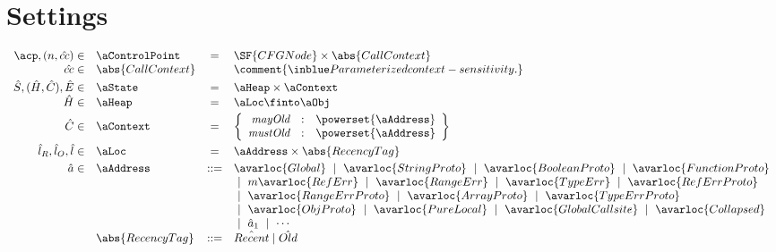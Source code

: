 \section{Settings}
\[
\begin{array}{rlcl}
\acp, (n, \hat{cc}) \in & \aControlPoint & = & \SF{CFGNode} \times \abs{CallContext} \\
\hat{cc} \in & \abs{CallContext} &  & \comment{\inblue  Parameterized context-sensitivity.} \vspace{1mm}\\

\hat{S}, (\hat{H}, \hat{C}), \hat{E} \in & \aState & = &  \aHeap \times \aContext\\
\hat{H} \in & \aHeap & = & \aLoc \finto \aObj \vspace{1mm}\\
\hat{C} \in & \aContext & = &
\left\{ \begin{array}{rcl}
\emph{mayOld} & : & \powerset{\aAddress} \\
\emph{mustOld} & : & \powerset{\aAddress} \\
\end{array} \right\} \vspace{1mm}\\

\hat{l}_R,\hat{l}_O,\hat{l} \in & \aLoc &  = & \aAddress \times \abs{RecencyTag} \vspace{1mm}\\
\hat{a} \in & \aAddress & ::= & \avarloc{Global} ~\mid~ 
                                \avarloc{StringProto} ~\mid~ 
                                \avarloc{BooleanProto} ~\mid~ 
                                \avarloc{FunctionProto} \\
                          & & & ~\mid~m 
                                \avarloc{RefErr} ~\mid~ 
                                \avarloc{RangeErr} ~\mid~ 
                                \avarloc{TypeErr} ~\mid~ 
                                \avarloc{RefErrProto}  \\
                          & & & ~\mid~ 
                                 \avarloc{RangeErrProto} ~\mid~ 
                                 \avarloc{ArrayProto} ~\mid~ 
                                 \avarloc{TypeErrProto} \\
                          & & & ~\mid~ 
                                 \avarloc{ObjProto} ~\mid~ 
                                 \avarloc{PureLocal} ~\mid~ 
                                 \avarloc{GlobalCallsite} ~\mid~ 
                                 \avarloc{Collapsed} \\
                          & & & ~\mid~
                                 \hat{a}_1 ~\mid~ \cdots \\
    & \abs{RecencyTag} & ::= & \hat{Recent} \mid \hat{Old} \vspace{1mm}\\


\end{array}\]
